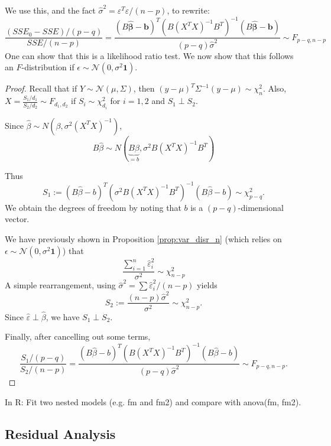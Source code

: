\documentclass[11pt, %
	oneside, %
	english, %
	onehalfspacing, %
	]{article} %
\numberwithin{equation}{section}
\begin{document}
We use this, and the fact $\hat{\sigma}^2 = \varepsilon^T \varepsilon / (n-p)$, to rewrite:
\begin{equation*}
    \frac{\left(S S E_0-S S E\right) /(p-q)}{S S E /(n-p)}=\frac{(B \widehat{\mathbf{\beta}}-\mathbf{b})^T\left(B\left(X^T X\right)^{-1} B^T\right)^{-1}(B \widehat{\mathbf{\beta}}-\mathbf{b})}{(p-q) \widehat{\sigma}^2} \sim F_{p-q, n-p}
\end{equation*}
One can show that this is a likelihood ratio test. We now show that this follows an $F$-distribution if $\epsilon \sim \mathcal{N}(0, \sigma^2 \mathbf{1})$.

\begin{proof}
    Recall that if $Y \sim \mathcal{N}(\mu, \Sigma)$, then $(y- \mu)^T \Sigma^{-1}(y-\mu) \sim \chi^2_n$. Also, $X = \frac{S_1 / d_1}{S_2 / d_2} \sim F_{d_1,d_2}$ if $S_i \sim \chi^2_{d_i}$ for $i = 1,2$ and $S_1 \perp S_2$.

    Since $\hat{\beta} \sim N(\beta, \sigma^2 (X^TX)^{-1})$,
    $$
    B \hat{\beta} \sim N(\underbrace{ B\beta }_{ =b }, \sigma^2B(X^TX)^{-1} B^T)
    $$

    Thus
    $$
    S_1 := (B \hat{\beta} - b)^T \left( \sigma^2 B (X^TX)^{-1} B^T \right)^{-1} (B \hat{\beta} - b) \sim \chi^2_{p-q}.
    $$
    We obtain the degrees of freedom by noting that $b$ is a $(p - q)$-dimensional vector.

    We have previously shown in Proposition \ref{prop:var_disr_n} (which relies on $\epsilon \sim \mathcal{N}(0, \sigma^2 \mathbf{1})$) that
    $$
    \frac{\sum_{ i=1 }^{ n } \hat{\varepsilon}_i^2 }{\sigma^2} \sim \chi^2_{n-p}
    $$
    A simple rearrangement, using $\hat{\sigma}^2 = \sum \hat{\varepsilon}_i^2 / (n-p) $  yields
    $$
    S_2 := \frac{(n-p) \hat{\sigma}^2}{\sigma^2} \sim \chi^2_{n-p}.
    $$
    Since $\hat{\varepsilon} \perp \hat{\beta}$, we have $S_1 \perp S_2$.

    Finally, after cancelling out some terms,
    $$
    \frac{S_1 / (p-q) }{S_2 / (n-p)} = \frac{(B \hat{\beta} - b)^T \left(  B (X^TX)^{-1} B^T \right)^{-1} (B \hat{\beta} - b)}{(p-q) \hat{\sigma}^2} \sim F_{p-q, n-p}.
    $$
\end{proof}

In R: Fit two nested models (e.g. fm and fm2) and compare with anova(fm, fm2).

\subsection{Residual Analysis}
\end{document}
